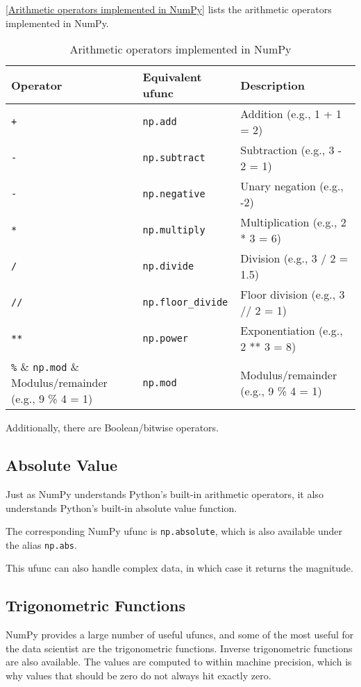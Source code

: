 \autoref{Arithmetic operators implemented in NumPy} lists the arithmetic operators implemented in NumPy.

\begin{table}
    \centering
    \caption{Arithmetic operators implemented in NumPy}
    \label{Arithmetic operators implemented in NumPy}
    \begin{tabular}{lll}
        \hline
        Operator  & Equivalent ufunc       & Description                          \\
        \hline
        \verb|+|  & \verb|np.add|          & Addition (e.g., 1 + 1 = 2)           \\
        \verb|-|  & \verb|np.subtract|     & Subtraction (e.g., 3 - 2 = 1)        \\
        \verb|-|  & \verb|np.negative|     & Unary negation (e.g., -2)            \\
        \verb|*|  & \verb|np.multiply|     & Multiplication (e.g., 2 * 3 = 6)     \\
        \verb|/|  & \verb|np.divide|       & Division (e.g., 3 / 2 = 1.5)         \\
        \verb|//| & \verb|np.floor_divide| & Floor division (e.g., 3 // 2 = 1)    \\
        \verb|**| & \verb|np.power|        & Exponentiation (e.g., 2 ** 3 = 8)    \\
        \verb|%|  & \verb|np.mod|          & Modulus/remainder (e.g., 9 \% 4 = 1) \\
        \hline
    \end{tabular}
\end{table}

Additionally, there are Boolean/bitwise operators.

\subsection*{Absolute Value}

Just as NumPy understands Python's built-in arithmetic operators, it also understands
Python's built-in absolute value function.

The corresponding NumPy ufunc is \verb|np.absolute|, which is also available under the
alias \verb|np.abs|.

This ufunc can also handle complex data, in which case it returns the magnitude.

\subsection*{Trigonometric Functions}
NumPy provides a large number of useful ufuncs, and some of the most useful for the
data scientist are the trigonometric functions. Inverse trigonometric functions are also
available. The values are computed to within machine precision, which is why values that should be zero do not always hit exactly zero.

